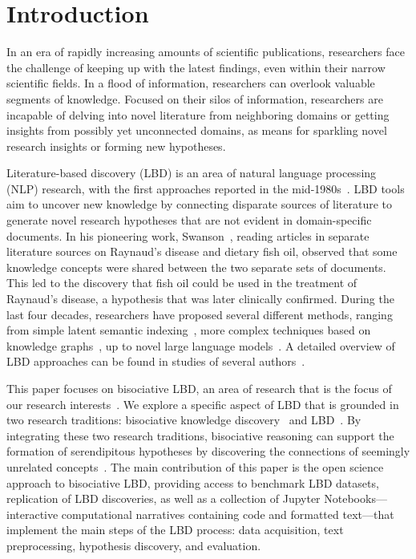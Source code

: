\documentclass[runningheads]{llncs}
\begin{document}
\section{Introduction}

In an era of rapidly increasing amounts of scientific publications, researchers face the challenge of keeping up with the latest findings, even within their narrow scientific fields. In a flood of information, researchers can overlook valuable segments of knowledge. Focused on their silos of information, researchers are incapable of delving into novel literature from neighboring domains or getting insights from possibly yet unconnected domains, as means for sparkling novel research insights or forming new hypotheses.

Literature-based discovery (LBD) is an area of natural language processing (NLP) research, with the first approaches reported in the mid-1980s~\cite{swanson1986fish}. LBD tools aim to uncover new knowledge by connecting disparate sources of literature to generate novel research hypotheses that are not evident in domain-specific documents. In his pioneering work, Swanson~\cite{swanson1986fish}, reading articles in separate literature sources on Raynaud's disease and dietary fish oil, observed that some knowledge concepts were shared between the two separate sets of documents. This led to the discovery that fish oil could be used in the treatment of Raynaud's disease, a hypothesis that was later clinically confirmed. During the last four decades, researchers have proposed several different methods, ranging from simple latent semantic indexing~\cite{gordon1998using}, more complex techniques based on knowledge graphs~\cite{sang2018sematyp}, up to novel large language models~\cite{wang2024scimon}. A detailed overview of LBD approaches can be found in studies of several authors~\cite{sebastian2017emerging,thilakaratne2019systematic,kastrin2021scientometric}.

This paper focuses on bisociative LBD, an area of research that is the focus of our research interests~\cite{lavrac2020bisociative,kastrin2021scientometric}. We explore a specific aspect of LBD that is grounded in two research traditions: bisociative knowledge discovery~\cite{berthold2012bisociative} and LBD~\cite{swanson1990medical}. By integrating these two research traditions, bisociative reasoning can support the formation of serendipitous hypotheses by discovering the connections of seemingly unrelated concepts~\cite{koestler1964art}. The main contribution of this paper is the open science approach to bisociative LBD, providing access to benchmark LBD datasets, replication of LBD discoveries, as well as a collection of Jupyter Notebooks---interactive computational narratives containing code and formatted text---that implement the main steps of the LBD process: data acquisition, text preprocessing, hypothesis discovery, and evaluation. 
\end{document}
